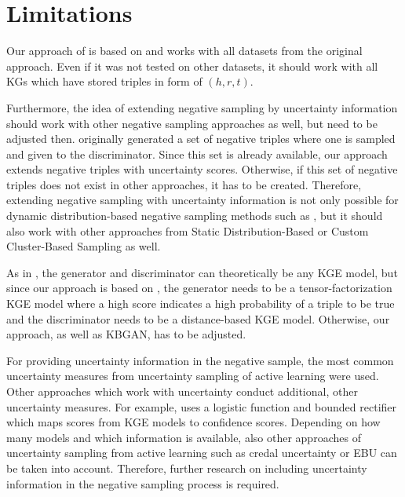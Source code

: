 \section{Limitations}  
\label{sec:limitations}
%
Our approach of \usgan is based on \kbgan and works with all datasets from the original approach.
Even if it was not tested on other datasets, it should work with all \acp{KG} which have stored triples in form of $(h,r,t)$.

Furthermore, the idea of extending negative sampling by uncertainty information should work with other negative sampling approaches as well, but need to be adjusted then.
\kbgan originally generated a set of negative triples where one is sampled and given to the discriminator.
Since this set is already available, our approach extends negative triples with uncertainty scores.
Otherwise, if this set of negative triples does not exist in other approaches, it has to be created.
Therefore, extending negative sampling with uncertainty information is not only possible for dynamic distribution-based negative sampling methods such as \kbgan, but it should also work with other approaches from Static Distribution-Based or Custom Cluster-Based Sampling as well.

As in \kbgan, the generator and discriminator can theoretically be any \ac{KGE} model, but since our approach is based on \kbgan, the generator needs to be a tensor-factorization \ac{KGE} model where a high score indicates a high probability of a triple to be true and the discriminator needs to be a distance-based \ac{KGE} model.
Otherwise, our approach, as well as \textsc{KBGAN}, has to be adjusted.

For providing uncertainty information in the negative sample, the most common uncertainty measures from uncertainty sampling of active learning were used.
Other approaches which work with uncertainty conduct additional, other uncertainty measures.
For example, \cite{UKGE} uses a logistic function and bounded rectifier which maps scores from \ac{KGE} models to confidence scores.
Depending on how many models and which information is available, also other approaches of uncertainty sampling from active learning such as credal uncertainty or \ac{EBU} can be taken into account.
Therefore, further research on including uncertainty information in the negative sampling process is required.

